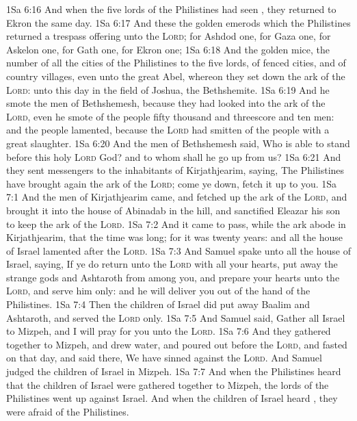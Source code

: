 \vs 1Sa 6:16 And when the five lords of the Philistines had seen , they returned to Ekron the same day.
\vs 1Sa 6:17 And these  the golden emerods which the Philistines returned  a trespass offering unto the \textsc{Lord}; for Ashdod one, for Gaza one, for Askelon one, for Gath one, for Ekron one;
\vs 1Sa 6:18 And the golden mice,  the number of all the cities of the Philistines  to the five lords,  of fenced cities, and of country villages, even unto the great  Abel, whereon they set down the ark of the \textsc{Lord}:  unto this day in the field of Joshua, the Bethshemite.
\vs 1Sa 6:19 And he smote the men of Bethshemesh, because they had looked into the ark of the \textsc{Lord}, even he smote of the people fifty thousand and threescore and ten men: and the people lamented, because the \textsc{Lord} had smitten  of the people with a great slaughter.
\vs 1Sa 6:20 And the men of Bethshemesh said, Who is able to stand before this holy \textsc{Lord} God? and to whom shall he go up from us?
\vs 1Sa 6:21 And they sent messengers to the inhabitants of Kirjathjearim, saying, The Philistines have brought again the ark of the \textsc{Lord}; come ye down,  fetch it up to you.
\vs 1Sa 7:1 And the men of Kirjathjearim came, and fetched up the ark of the \textsc{Lord}, and brought it into the house of Abinadab in the hill, and sanctified Eleazar his son to keep the ark of the \textsc{Lord}.
\vs 1Sa 7:2 And it came to pass, while the ark abode in Kirjathjearim, that the time was long; for it was twenty years: and all the house of Israel lamented after the \textsc{Lord}.
\vs 1Sa 7:3 And Samuel spake unto all the house of Israel, saying, If ye do return unto the \textsc{Lord} with all your hearts,  put away the strange gods and Ashtaroth from among you, and prepare your hearts unto the \textsc{Lord}, and serve him only: and he will deliver you out of the hand of the Philistines.
\vs 1Sa 7:4 Then the children of Israel did put away Baalim and Ashtaroth, and served the \textsc{Lord} only.
\vs 1Sa 7:5 And Samuel said, Gather all Israel to Mizpeh, and I will pray for you unto the \textsc{Lord}.
\vs 1Sa 7:6 And they gathered together to Mizpeh, and drew water, and poured  out before the \textsc{Lord}, and fasted on that day, and said there, We have sinned against the \textsc{Lord}. And Samuel judged the children of Israel in Mizpeh.
\vs 1Sa 7:7 And when the Philistines heard that the children of Israel were gathered together to Mizpeh, the lords of the Philistines went up against Israel. And when the children of Israel heard , they were afraid of the Philistines.
